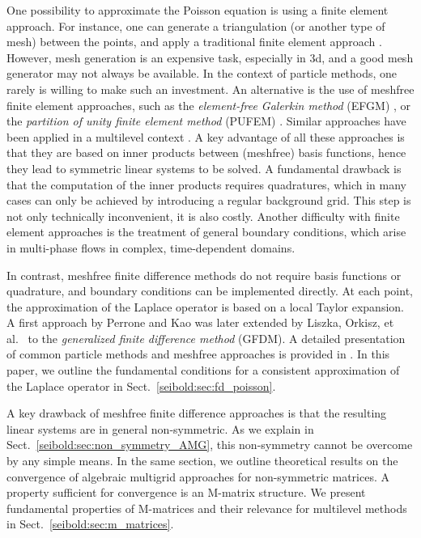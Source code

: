 \documentclass[reqno]{amsart}
\theoremstyle{plain}
\theoremstyle{definition}
\theoremstyle{remark}
\begin{document}
One possibility to approximate the Poisson equation is using a finite element approach.
For instance, one can generate a triangulation \cite{Shewchuk1999}
(or another type of mesh) between the points, and apply a traditional finite element
approach \cite{StrangFix1973}.
However, mesh generation is an expensive task, especially in 3d, and a good mesh
generator may not always be available. In the context of particle methods, one
rarely is willing to make such an investment.
An alternative is the use of meshfree finite element approaches, such as
the \emph{element-free Galerkin method} (EFGM) \cite{BelytschkoGuLu1994},
or the \emph{partition of unity finite element method}
(PUFEM) \cite{BabuskaMelenk1996,BabuskaMelenk1997}.
Similar approaches \cite{GriebelSchweitzer2000} have been applied in a
multilevel context \cite{GriebelSchweitzer2002_2}.
A key advantage of all these approaches is that they are based on inner products
between (meshfree) basis functions, hence they lead to symmetric linear systems
to be solved. A fundamental drawback is that the computation of the inner products
requires quadratures, which in many cases can only be achieved by introducing a regular
background grid. This step is not only technically inconvenient, it is also costly.
Another difficulty with finite element approaches is the treatment of general boundary
conditions, which arise in multi-phase flows in complex, time-dependent domains.

In contrast, meshfree finite difference methods do not require basis functions
or quadrature, and boundary conditions can be implemented directly. At each point,
the approximation of the Laplace operator is based on a local Taylor expansion.
A first approach by Perrone and Kao \cite{PerroneKao1975} was later extended by
Liszka, Orkisz, et al.~\cite{LiszkaOrkisz1980,DemkowiczKarafiatLiszka1984} to
the \emph{generalized finite difference method} (GFDM).
A detailed presentation of common particle methods and meshfree approaches is provided
in \cite{SeiboldDiss2006}.
In this paper, we outline the fundamental conditions for a consistent approximation
of the Laplace operator in Sect.~\ref{seibold:sec:fd_poisson}.

A key drawback of meshfree finite difference approaches is that the resulting linear
systems are in general non-symmetric. As we explain in
Sect.~\ref{seibold:sec:non_symmetry_AMG}, this non-symmetry cannot be overcome by any
simple means. In the same section, we outline theoretical results on the convergence of
algebraic multigrid approaches for non-symmetric matrices. A property sufficient for
convergence is an M-matrix structure. We present fundamental properties of M-matrices
and their relevance for multilevel methods in Sect.~\ref{seibold:sec:m_matrices}.
\end{document}
